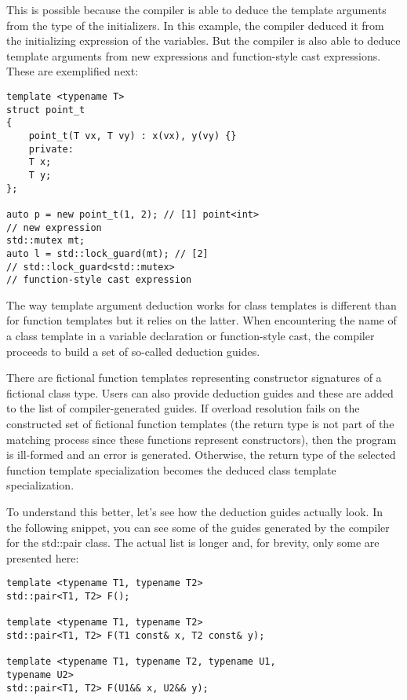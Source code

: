 This is possible because the compiler is able to deduce the template arguments from the type of the initializers. In this example, the compiler deduced it from the initializing expression of the variables. But the compiler is also able to deduce template arguments from new expressions and function-style cast expressions. These are exemplified next:

\begin{lstlisting}[style=styleCXX]
template <typename T>
struct point_t
{
	point_t(T vx, T vy) : x(vx), y(vy) {}
	private:
	T x;
	T y;
};

auto p = new point_t(1, 2); // [1] point<int>
// new expression
std::mutex mt;
auto l = std::lock_guard(mt); // [2]
// std::lock_guard<std::mutex>
// function-style cast expression
\end{lstlisting}

The way template argument deduction works for class templates is different than for function templates but it relies on the latter. When encountering the name of a class template in a variable declaration or function-style cast, the compiler proceeds to build a set of so-called deduction guides.

There are fictional function templates representing constructor signatures of a fictional class type. Users can also provide deduction guides and these are added to the list of compiler-generated guides. If overload resolution fails on the constructed set of fictional function templates (the return type is not part of the matching process since these functions represent constructors), then the program is ill-formed and an error is generated. Otherwise, the return type of the selected function template specialization becomes the deduced class template specialization.

To understand this better, let’s see how the deduction guides actually look. In the following snippet, you can see some of the guides generated by the compiler for the std::pair class. The actual list is longer and, for brevity, only some are presented here:

\begin{lstlisting}[style=styleCXX]
template <typename T1, typename T2>
std::pair<T1, T2> F();

template <typename T1, typename T2>
std::pair<T1, T2> F(T1 const& x, T2 const& y);

template <typename T1, typename T2, typename U1,
typename U2>
std::pair<T1, T2> F(U1&& x, U2&& y);
\end{lstlisting}

